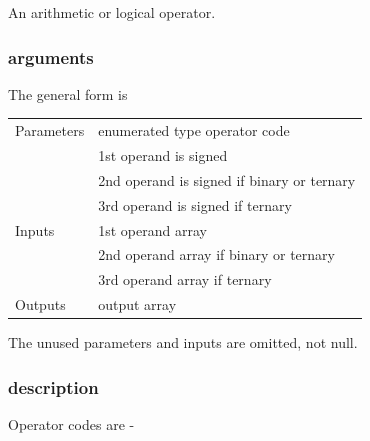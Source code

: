 \documentclass[10pt,a4paper,twoside,fleqn]{book}
\begin{document}
                    An arithmetic or logical operator.

                \subsubsection{arguments}

                    The general form is

                    \begin{tabular}{| l | l |}
                    \hline
                    Parameters  & enumerated type operator code \\
                                & 1st operand is signed \\
                                & 2nd operand is signed if binary or ternary \\
                                & 3rd operand is signed if ternary \\
                    \hline
                    Inputs      & 1st operand array \\
                                & 2nd operand array if binary or ternary \\
                                & 3rd operand array if ternary \\
                    \hline
                    Outputs     & output array \\
                    \hline
                    \end{tabular}

                    The unused parameters and inputs are omitted, not null.

                \subsubsection{description}

                    Operator codes are -
\end{document}
